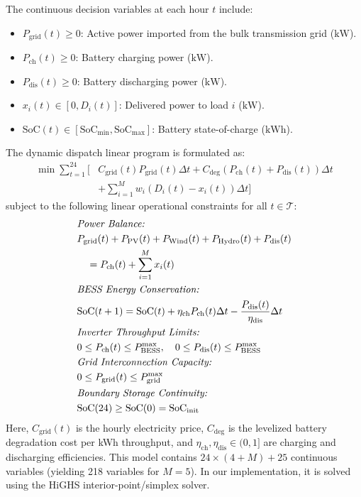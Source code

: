 \documentclass[11pt,a4paper]{article}
\theoremstyle{definition}
\theoremstyle{remark}
\begin{document}
The continuous decision variables at each hour $t$ include:
\begin{itemize}
    \item $P_{\text{grid}}(t) \ge 0$: Active power imported from the bulk transmission grid ($\text{kW}$).
    \item $P_{\text{ch}}(t) \ge 0$: Battery charging power ($\text{kW}$).
    \item $P_{\text{dis}}(t) \ge 0$: Battery discharging power ($\text{kW}$).
    \item $x_i(t) \in [0, D_i(t)]$: Delivered power to load $i$ ($\text{kW}$).
    \item $\text{SoC}(t) \in [\text{SoC}_{\min}, \text{SoC}_{\max}]$: Battery state-of-charge ($\text{kWh}$).
\end{itemize}

The dynamic dispatch linear program is formulated as:
\begin{align}
\min \sum_{t=1}^{24} \Bigg[ & C_{\text{grid}}(t) P_{\text{grid}}(t) \Delta t + C_{\text{deg}} \left( P_{\text{ch}}(t) + P_{\text{dis}}(t) \right) \Delta t \nonumber \\
& + \sum_{i=1}^M w_i \left( D_i(t) - x_i(t) \right) \Delta t \Bigg]
\label{eq:lp_dispatch}
\end{align}
subject to the following linear operational constraints for all $t \in \mathcal{T}$:
\begin{align}
&\text{\textit{Power Balance:}} \nonumber \\
&P_{\text{grid}}(t) + P_{\text{PV}}(t) + P_{\text{Wind}}(t) + P_{\text{Hydro}}(t) + P_{\text{dis}}(t) \nonumber \\
&\quad = P_{\text{ch}}(t) + \sum_{i=1}^M x_i(t) \label{eq:lp_balance} \\
&\text{\textit{BESS Energy Conservation:}} \nonumber \\
&\text{SoC}(t+1) = \text{SoC}(t) + \eta_{\text{ch}} P_{\text{ch}}(t) \Delta t - \frac{P_{\text{dis}}(t)}{\eta_{\text{dis}}} \Delta t \label{eq:lp_soc} \\
&\text{\textit{Inverter Throughput Limits:}} \nonumber \\
&0 \le P_{\text{ch}}(t) \le P_{\text{BESS}}^{\max}, \quad 0 \le P_{\text{dis}}(t) \le P_{\text{BESS}}^{\max} \label{eq:lp_bess_power} \\
&\text{\textit{Grid Interconnection Capacity:}} \nonumber \\
&0 \le P_{\text{grid}}(t) \le P_{\text{grid}}^{\max} \label{eq:lp_grid_limit} \\
&\text{\textit{Boundary Storage Continuity:}} \nonumber \\
&\text{SoC}(24) \ge \text{SoC}(0) = \text{SoC}_{\text{init}} \label{eq:lp_terminal}
\end{align}
Here, $C_{\text{grid}}(t)$ is the hourly electricity price, $C_{\text{deg}}$ is the levelized battery degradation cost per kWh throughput, and $\eta_{\text{ch}}, \eta_{\text{dis}} \in (0, 1]$ are charging and discharging efficiencies. This model contains $24 \times (4 + M) + 25$ continuous variables (yielding 218 variables for $M = 5$). In our implementation, it is solved using the HiGHS interior-point/simplex solver.
\end{document}
